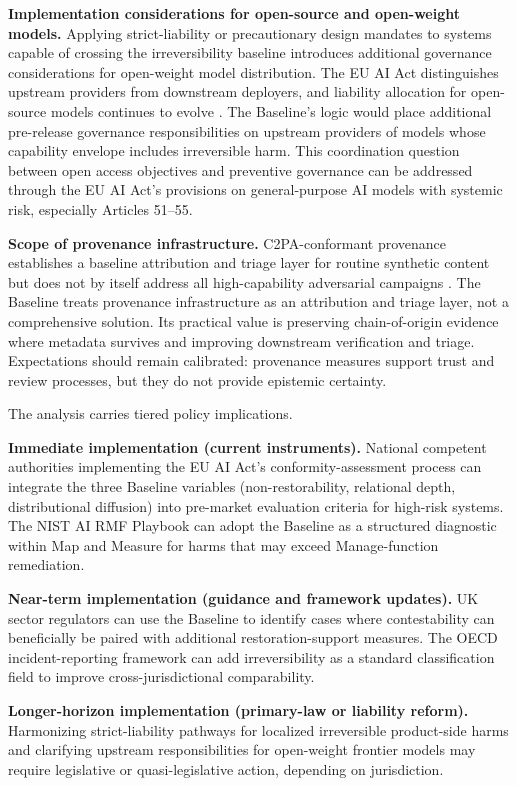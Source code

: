 \documentclass[11pt]{article}
\begin{document}
\textbf{Implementation considerations for open-source and open-weight models.} Applying strict-liability or precautionary design mandates to systems capable of crossing the irreversibility baseline introduces additional governance considerations for open-weight model distribution. The EU AI Act distinguishes upstream providers from downstream deployers, and liability allocation for open-source models continues to evolve \parencite{euaiact2024}. The Baseline's logic would place additional pre-release governance responsibilities on upstream providers of models whose capability envelope includes irreversible harm. This coordination question between open access objectives and preventive governance can be addressed through the EU AI Act's provisions on general-purpose AI models with systemic risk, especially Articles 51--55.

\textbf{Scope of provenance infrastructure.} C2PA-conformant provenance establishes a baseline attribution and triage layer for routine synthetic content but does not by itself address all high-capability adversarial campaigns \parencite{helmus2022}. The Baseline treats provenance infrastructure as an attribution and triage layer, not a comprehensive solution. Its practical value is preserving chain-of-origin evidence where metadata survives and improving downstream verification and triage. Expectations should remain calibrated: provenance measures support trust and review processes, but they do not provide epistemic certainty.

The analysis carries tiered policy implications.

\textbf{Immediate implementation (current instruments).} National competent authorities implementing the EU AI Act's conformity-assessment process can integrate the three Baseline variables (non-restorability, relational depth, distributional diffusion) into pre-market evaluation criteria for high-risk systems. The NIST AI RMF Playbook can adopt the Baseline as a structured diagnostic within Map and Measure for harms that may exceed Manage-function remediation.

\textbf{Near-term implementation (guidance and framework updates).} UK sector regulators can use the Baseline to identify cases where contestability can beneficially be paired with additional restoration-support measures. The OECD incident-reporting framework can add irreversibility as a standard classification field to improve cross-jurisdictional comparability.

\textbf{Longer-horizon implementation (primary-law or liability reform).} Harmonizing strict-liability pathways for localized irreversible product-side harms and clarifying upstream responsibilities for open-weight frontier models may require legislative or quasi-legislative action, depending on jurisdiction.
\end{document}
